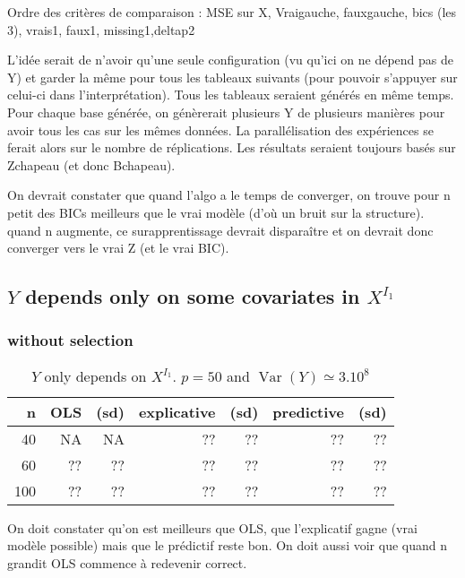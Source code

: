 \documentclass[11pt,a4paper]{article}
\begin{document}
Ordre des critères de comparaison : MSE sur X, Vraigauche, fauxgauche, bics (les 3), vrais1, faux1, missing1,deltap2

	L'idée serait de n'avoir qu'une seule configuration (vu qu'ici on ne dépend pas de Y) et garder la même pour tous les tableaux suivants (pour pouvoir s'appuyer sur celui-ci dans l'interprétation). Tous les tableaux seraient générés en même temps. Pour chaque base générée, on génèrerait plusieurs Y de plusieurs manières pour avoir tous les cas sur les mêmes données.
	La parallélisation des expériences se ferait alors sur le nombre de réplications. Les résultats seraient toujours basés sur Zchapeau (et donc Bchapeau).
	
	On devrait constater que quand l'algo a le temps de converger, on trouve pour n petit des BICs meilleurs que le vrai modèle (d'où un bruit sur la structure). quand n augmente, ce surapprentissage devrait disparaître et on devrait donc converger vers le vrai Z (et le vrai BIC).
	
	\subsection{$Y$ depends only on some covariates in $X^{I_1}$}	
		
	
		\subsubsection{without selection}
			\begin{table}[h!]
			\centering
			\begin{tabular}{|r|rr|rr|rr|}
			  \hline
			n & OLS & (sd) & explicative & (sd) & predictive & (sd) \\ 
			  \hline
			 40 & NA & NA & ?? & ??& ?? & ?? \\ 
			  60 & ??& ?? & ?? & ?? & ?? & ?? \\ 
			  100 & ?? & ?? & ?? & ?? & ?? & ?? \\ 
			   \hline
			\end{tabular}
			\caption{$Y$ only depends on $X^{I_1}$. $p=50$ and $\operatorname{Var}(Y)\simeq 3.10^8$}
			\end{table}
						
			On doit constater qu'on est meilleurs que OLS, que l'explicatif gagne (vrai modèle possible) mais que le prédictif reste bon. On doit aussi voir que quand n grandit OLS commence à redevenir correct.
\end{document}

